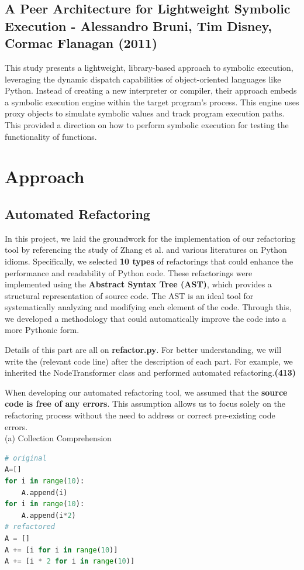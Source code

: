 \documentclass[11pt]{article}
\begin{document}
\subsection{A Peer Architecture for Lightweight Symbolic Execution - Alessandro Bruni, Tim Disney, Cormac Flanagan (2011)}
This study presents a lightweight, library-based approach to symbolic execution, leveraging the dynamic dispatch capabilities of object-oriented languages like Python. Instead of creating a new interpreter or compiler, their approach embeds a symbolic execution engine within the target program's process. This engine uses proxy objects to simulate symbolic values and track program execution paths. This provided a direction on how to perform symbolic execution for testing the functionality of functions.

\section{Approach}

\subsection{Automated Refactoring}
In this project, we laid the groundwork for the implementation of our refactoring tool by referencing the study of Zhang et al. and various literatures on Python idioms. Specifically, we selected \textbf{10 types} of refactorings that could enhance the performance and readability of Python code. These refactorings were implemented using the \textbf{Abstract Syntax Tree (AST)}, which provides a structural representation of source code. The AST is an ideal tool for systematically analyzing and modifying each element of the code. Through this, we developed a methodology that could automatically improve the code into a more Pythonic form.

Details of this part are all on \textbf{refactor.py}. For better understanding, we will write the (relevant code line) after the description of each part. For example, we inherited the NodeTransformer class and performed automated refactoring.\textbf{(413)}

When developing our automated refactoring tool, we assumed that the \textbf{source code is free of any errors}. This assumption allows us to focus solely on the refactoring process without the need to address or correct pre-existing code errors. \\

(a) Collection Comprehension
\begin{lstlisting}[language=python]
# original
A=[]
for i in range(10):
    A.append(i)
for i in range(10):
    A.append(i*2)
# refactored
A = []
A += [i for i in range(10)]
A += [i * 2 for i in range(10)]
\end{lstlisting}
\end{document}

